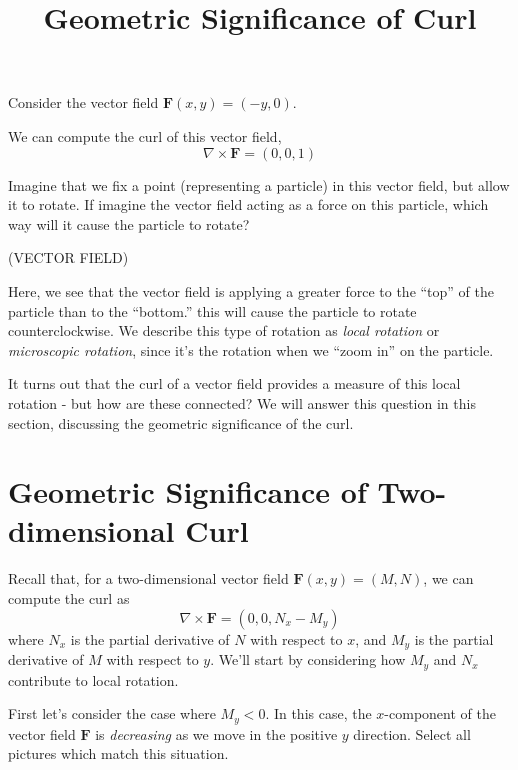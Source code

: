 \documentclass{ximera}
\title{Geometric Significance of Curl}
\begin{document}
  
\begin{abstract}  
\end{abstract}  
\maketitle 

Consider the vector field $\mathbf{F}(x,y)=(-y,0)$.

We can compute the curl of this vector field, 
\[
\nabla\times\mathbf{F}=(0,0,1)
\]

Imagine that we fix a point (representing a particle) in this vector field, but allow it to rotate. If imagine the vector field acting as a force on this particle, which way will it cause the particle to rotate?

(VECTOR FIELD)

Here, we see that the vector field is applying a greater force to the ``top'' of the particle than to the ``bottom.'' this will cause the particle to rotate counterclockwise. We describe this type of rotation as \emph{local rotation} or \emph{microscopic rotation}, since it's the rotation when we ``zoom in'' on the particle.

It turns out that the curl of a vector field provides a measure of this local rotation - but how are these connected? We will answer this question in this section, discussing the geometric significance of the curl.

\section{Geometric Significance of Two-dimensional Curl}

Recall that, for a two-dimensional vector field $\mathbf{F}(x,y)=(M,N)$, we can compute the curl as
\[
\nabla\times\mathbf{F} = (0,0,N_x-M_y)
\]
where $N_x$ is the partial derivative of $N$ with respect to $x$, and $M_y$ is the partial derivative of $M$ with respect to $y$. We'll start by considering how $M_y$ and $N_x$ contribute to local rotation.

First let's consider the case where $M_y<0$. In this case, the $x$-component of the vector field $\mathbf{F}$ is \emph{decreasing} as we move in the positive $y$ direction. Select all pictures which match this situation.
\end{document}
